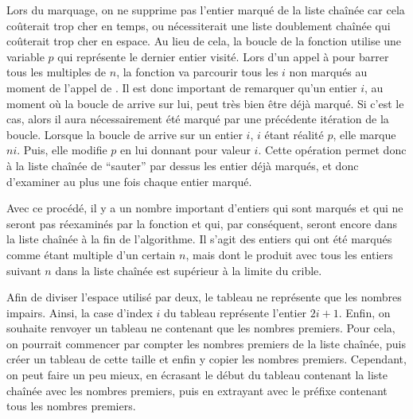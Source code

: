 \documentclass[a4paper]{easychair}
\newcommand\arr[1]{\ocamlf{arr[}#1\ocamlf{]}}
\begin{document}
Lors du marquage, on ne supprime pas l'entier marqué de la liste chaînée car
cela coûterait trop cher en temps, ou nécessiterait une liste doublement
chaînée qui coûterait trop cher en espace.
Au lieu de cela, la boucle de la fonction 
utilise une variable $p$ qui représente le dernier entier visité.
Lors d'un appel à  pour barrer tous les multiples
de $n$,
la fonction va parcourir tous les $i$ non marqués au moment de l'appel de
. Il est donc important de remarquer qu'un entier $i$,
au moment où la boucle de  arrive sur lui,
peut très bien
être déjà marqué. Si c'est le cas, alors il aura nécessairement été marqué par
une précédente itération de la boucle.
Lorsque la boucle de  arrive sur un entier $i$,
$i$ étant réalité \arr{$p$}, elle marque $ni$.
Puis, elle modifie \arr{$p$} en lui donnant pour valeur \arr{$i$}.
Cette opération permet donc à la liste chaînée de ``sauter'' par dessus
les entier déjà marqués, et donc d'examiner au plus une fois chaque
entier marqué.

Avec ce procédé, il y a un nombre important d'entiers qui sont marqués et
qui ne seront pas réexaminés par la fonction  et qui,
par conséquent, seront encore dans la liste chaînée à la fin de l'algorithme.
Il s'agit des entiers qui ont été marqués comme étant multiple d'un certain
$n$, mais dont le produit avec tous les entiers suivant $n$ dans la liste
chaînée est supérieur à la limite du crible.

Afin de diviser l'espace utilisé par deux, le tableau  ne
représente que les nombres
impairs. Ainsi, la case d'index $i$ du tableau représente l'entier $2i + 1$.
Enfin, on souhaite renvoyer un tableau ne contenant que les nombres premiers.
Pour cela, on pourrait commencer par compter les nombres premiers
de la liste chaînée, puis créer un tableau de cette taille et enfin y copier
les nombres premiers.
Cependant, on peut faire un peu mieux, en écrasant le début du tableau
contenant la liste chaînée avec les nombres premiers, puis en
extrayant avec  le préfixe contenant tous les nombres
premiers.

\end{document}
